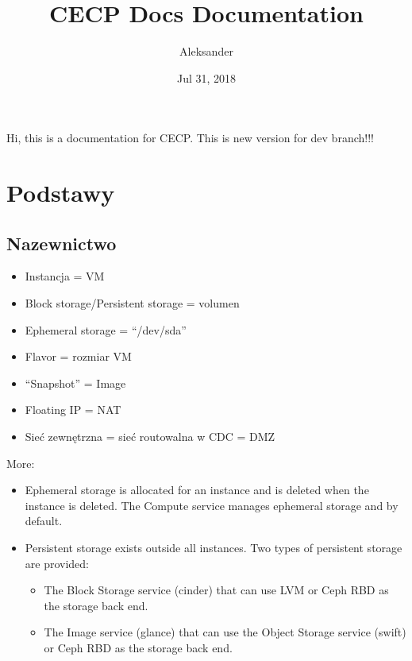 \documentclass[letterpaper,10pt,english]{sphinxmanual}
\title{CECP Docs Documentation}
\date{Jul 31, 2018}
\author{Aleksander}
\begin{document}
\maketitle
\sphinxtableofcontents
{}\label{\detokenize{index::doc}}


Hi, this is a documentation for CECP.
This is new version for dev branch!!!


\chapter{Podstawy}
\label{\detokenize{basics/README:podstawy}}\label{\detokenize{basics/README:cecp-openstack-documentation}}\label{\detokenize{basics/README::doc}}

\section{Nazewnictwo}
\label{\detokenize{basics/README:nazewnictwo}}\begin{itemize}
\item {} 
Instancja = VM

\item {} 
Block storage/Persistent storage = volumen

\item {} 
Ephemeral storage = “/dev/sda”

\item {} 
Flavor = rozmiar VM

\item {} 
“Snapshot” = Image

\item {} 
Floating IP = NAT

\item {} 
Sieć zewnętrzna = sieć routowalna w CDC = DMZ

\end{itemize}

More:
\begin{itemize}
\item {} 
Ephemeral storage is allocated for an instance and is deleted when the instance is deleted. The Compute service manages ephemeral storage and by default.

\item {} 
Persistent storage exists outside all instances. Two types of persistent storage are provided:
\begin{itemize}
\item {} 
The Block Storage service (cinder) that can use LVM or Ceph RBD as the storage back end.

\item {} 
The Image service (glance) that can use the Object Storage service (swift) or Ceph RBD as the storage back end.

\end{itemize}

\end{itemize}
\end{document}
